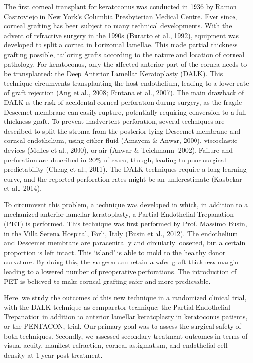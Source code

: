 \documentclass[authordate, empirical]{jote-new-article}
\begin{document}
	The first corneal transplant for keratoconus was conducted in 1936 by Ramon Castroviejo in New York's Columbia Presbyterian Medical Centre. Ever since, corneal grafting has been subject to many technical developments. With the advent of refractive surgery in the 1990s (Buratto et al., 1992), equipment was developed to split a cornea in horizontal lamellae. This made partial thickness grafting possible, tailoring grafts according to the nature and location of corneal pathology. For keratoconus, only the affected anterior part of the cornea needs to be transplanted: the Deep Anterior Lamellar Keratoplasty (DALK). This technique circumvents transplanting the host endothelium, leading to a lower rate of graft rejection (Ang et al., 2008; Fontana et al., 2007). The main drawback of DALK is the risk of accidental corneal perforation during surgery, as the fragile Descemet membrane can easily rupture, potentially requiring conversion to a full-thickness graft. To prevent inadvertent perforation, several techniques are described to split the stroma from the posterior lying Descemet membrane and corneal endothelium, using either fluid (Amayem \& Anwar, 2000), viscoelastic devices (Melles et al., 2000), or air (Anwar \& Teichmann, 2002). Failure and perforation are described in 20\% of cases, though, leading to poor surgical predictability (Cheng et al., 2011). The DALK techniques require a long learning curve, and the reported perforation rates might be an underestimate (Kasbekar et al., 2014).



	To circumvent this problem, a technique was developed in which, in addition to a mechanized anterior lamellar keratoplasty, a Partial Endothelial Trepanation (PET) is performed. This technique was first performed by Prof. Massimo Busin, in the Villa Serena Hospital, Forli, Italy (Busin et al., 2012).\textsuperscript{ }The endothelium and Descemet membrane are paracentrally and circularly loosened, but a certain proportion is left intact. This ‘island' is able to mold to the healthy donor curvature. By doing this, the surgeon can retain a safer graft thickness margin leading to a lowered number of preoperative perforations. The introduction of PET is believed to make corneal grafting safer and more predictable.



	Here, we study the outcomes of this new technique in a randomized clinical trial, with the DALK technique as comparator technique: the Partial Endothelial Trepanation in addition to anterior lamellar keratoplasty in keratoconus patients, or the PENTACON, trial. Our primary goal was to assess the surgical safety of both techniques. Secondly, we assessed secondary treatment outcomes in terms of visual acuity, manifest refraction, corneal astigmatism, and endothelial cell density at 1 year post-treatment.
\end{document}
